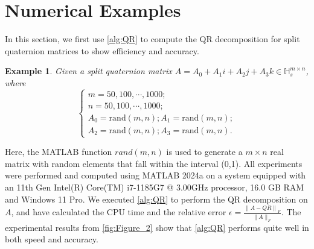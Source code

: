 \documentclass[12pt]{article}
\newtheorem{example}[theorem]{Example}
\numberwithin{equation}{section}
\begin{document}
\section{Numerical Examples}

In this section, we first use \cref{alg:QR} to compute the QR decomposition for split quaternion matrices to show  efficiency and accuracy.
\begin{example}
    Given a split quaternion matrix $A = A_{0}+A_{1}i+A_{2}j+A_{3}k\in \mathbb{H}_s^{m\times n}$, where
    \begin{equation}
       \begin{cases}
            m = 50,100,\cdots,1000;\\
            n = 50,100,\cdots,1000;  \\
            A_{0}=\text{rand}(m,n);
            A_{1}=\text{rand}(m,n); \\
            A_{2}=\text{rand}(m,n);
            A_{3}=\text{rand}(m,n).
        \end{cases} \label{eq:example2}
    \end{equation}
\end{example}
Here, the MATLAB function $rand(m,n)$ is used to generate a $m \times n$ real matrix with random elements that fall within the interval (0,1).  All experiments were performed and computed using MATLAB 2024a on a system equipped with an 11th Gen Intel(R) Core(TM) i7-1185G7 @ 3.00GHz processor, 16.0 GB RAM and Windows 11 Pro. We executed \cref{alg:QR} to perform the QR decomposition on $A$, and have calculated the CPU time and the relative error
$\epsilon = \frac{\left\|A - Q R\right\|_{F}}{\|A\|_{F}}.$
The experimental results from \cref{fig:Figure_2} show that \cref{alg:QR} performs quite well in both speed and accuracy. 
\end{document}
